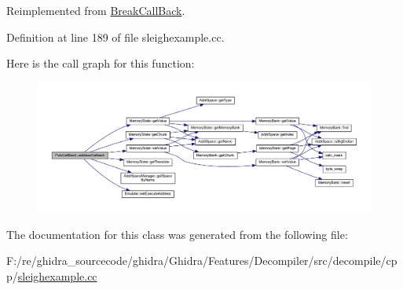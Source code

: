 Reimplemented from \mbox{\hyperlink{class_break_call_back_adb97ba6b111cb9a84856c9e0f9d506f9}{Break\+Call\+Back}}.



Definition at line 189 of file sleighexample.\+cc.

Here is the call graph for this function\+:
\nopagebreak
\begin{figure}[H]
\begin{center}
\leavevmode
\includegraphics[width=350pt]{class_puts_call_back_aed006bcf40674841a1799fa1374017b9_cgraph}
\end{center}
\end{figure}


The documentation for this class was generated from the following file\+:\begin{DoxyCompactItemize}
\item 
F\+:/re/ghidra\+\_\+sourcecode/ghidra/\+Ghidra/\+Features/\+Decompiler/src/decompile/cpp/\mbox{\hyperlink{sleighexample_8cc}{sleighexample.\+cc}}\end{DoxyCompactItemize}
